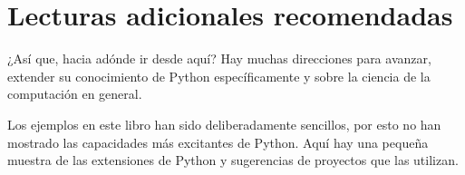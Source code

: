 

%

\chapter{Lecturas adicionales recomendadas}

¿Así que, hacia adónde ir desde aquí? Hay muchas direcciones para
avanzar, extender su conocimiento de Python específicamente y 
sobre la ciencia de la computación en general.

Los ejemplos en este libro han sido deliberadamente sencillos, 
por esto no han mostrado las capacidades más excitantes de Python.
Aquí hay una pequeña muestra de las extensiones de Python 
y sugerencias de proyectos que las utilizan.

